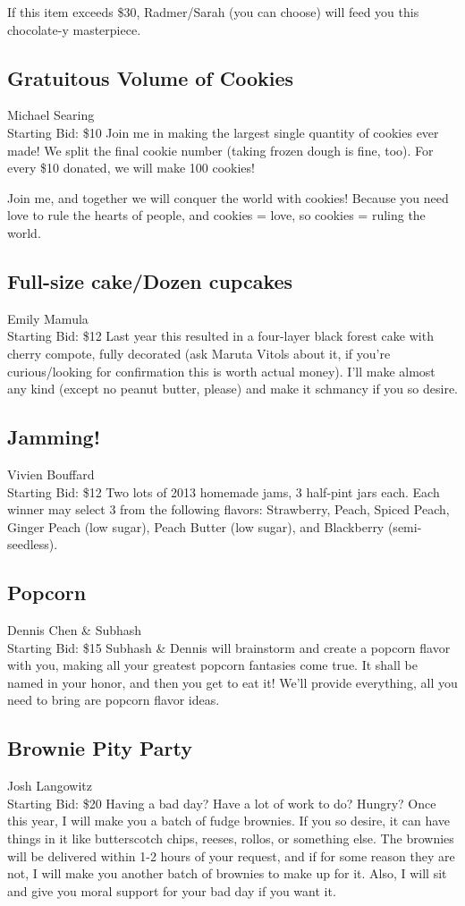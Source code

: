 \documentclass[11pt]{article}
\begin{document}
If this item exceeds \$30, Radmer/Sarah (you can choose) will feed you this chocolate-y masterpiece.
\subsection{Gratuitous Volume of Cookies}
Michael Searing
\\
Starting Bid: \$10
\newline
Join me in making the largest single quantity of cookies ever made!  We split the final cookie number (taking frozen dough is fine, too).  For every \$10 donated, we will make 100 cookies!

Join me, and together we will conquer the world with cookies!  Because you need love to rule the hearts of people, and cookies = love, so cookies = ruling the world.
\subsection{Full-size cake/Dozen cupcakes}
Emily Mamula
\\
Starting Bid: \$12
\newline
Last year this resulted in a four-layer black forest cake with cherry compote, fully decorated (ask Maruta Vitols about it, if you're curious/looking for confirmation this is worth actual money). I'll make almost any kind (except no peanut butter, please) and make it schmancy if you so desire.
\subsection{Jamming!}
Vivien Bouffard
\\
Starting Bid: \$12
\newline
Two lots of 2013 homemade jams, 3 half-pint jars each.  Each winner may select 3 from the following flavors:  Strawberry, Peach, Spiced Peach, Ginger Peach (low sugar), Peach Butter (low sugar), and Blackberry (semi-seedless).
\subsection{Popcorn }
Dennis Chen \& Subhash
\\
Starting Bid: \$15
\newline
Subhash \& Dennis will brainstorm and create a popcorn flavor with you, making all your greatest popcorn fantasies come true. It shall be named in your honor, and then you get to eat it! We'll provide everything, all you need to bring are popcorn flavor ideas.
\subsection{Brownie Pity Party}
Josh Langowitz
\\
Starting Bid: \$20
\newline
Having a bad day? Have a lot of work to do? Hungry? Once this year, I will make you a batch of fudge brownies. If you so desire, it can have things in it like butterscotch chips, reeses, rollos, or something else. The brownies will be delivered within 1-2 hours of your request, and if for some reason they are not, I will make you another batch of brownies to make up for it. Also, I will sit and give you moral support for your bad day if you want it.
\end{document}
